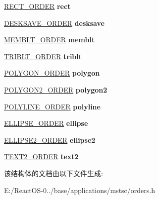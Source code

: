 \begin{DoxyCompactItemize}
\mbox{\label{struct___r_d_p___o_r_d_e_r___s_t_a_t_e_a5570ce07ebf3c90f3316fe1c67e268db}} 
\hyperlink{struct___r_e_c_t___o_r_d_e_r}{R\+E\+C\+T\+\_\+\+O\+R\+D\+ER} {\bfseries rect}
\item 
\mbox{\label{struct___r_d_p___o_r_d_e_r___s_t_a_t_e_a1d47551a1e631c6b5c34ece8b4f94918}} 
\hyperlink{struct___d_e_s_k_s_a_v_e___o_r_d_e_r}{D\+E\+S\+K\+S\+A\+V\+E\+\_\+\+O\+R\+D\+ER} {\bfseries desksave}
\item 
\mbox{\label{struct___r_d_p___o_r_d_e_r___s_t_a_t_e_a56a941c405ca7e6948a00362fc2429e1}} 
\hyperlink{struct___m_e_m_b_l_t___o_r_d_e_r}{M\+E\+M\+B\+L\+T\+\_\+\+O\+R\+D\+ER} {\bfseries memblt}
\item 
\mbox{\label{struct___r_d_p___o_r_d_e_r___s_t_a_t_e_a697766a2fd464a6e0e444dceaf68a183}} 
\hyperlink{struct___t_r_i_b_l_t___o_r_d_e_r}{T\+R\+I\+B\+L\+T\+\_\+\+O\+R\+D\+ER} {\bfseries triblt}
\item 
\mbox{\label{struct___r_d_p___o_r_d_e_r___s_t_a_t_e_a3aacbe1631a29128b24d56c6da83064e}} 
\hyperlink{struct___p_o_l_y_g_o_n___o_r_d_e_r}{P\+O\+L\+Y\+G\+O\+N\+\_\+\+O\+R\+D\+ER} {\bfseries polygon}
\item 
\mbox{\label{struct___r_d_p___o_r_d_e_r___s_t_a_t_e_a72e3ffc2f0d136071a3404be6ac2f833}} 
\hyperlink{struct___p_o_l_y_g_o_n2___o_r_d_e_r}{P\+O\+L\+Y\+G\+O\+N2\+\_\+\+O\+R\+D\+ER} {\bfseries polygon2}
\item 
\mbox{\label{struct___r_d_p___o_r_d_e_r___s_t_a_t_e_a84f168e73afc4b5b7d09705eda4cabb5}} 
\hyperlink{struct___p_o_l_y_l_i_n_e___o_r_d_e_r}{P\+O\+L\+Y\+L\+I\+N\+E\+\_\+\+O\+R\+D\+ER} {\bfseries polyline}
\item 
\mbox{\label{struct___r_d_p___o_r_d_e_r___s_t_a_t_e_aa6ada6e1bac8c5e880cf64337f8e1ccf}} 
\hyperlink{struct___e_l_l_i_p_s_e___o_r_d_e_r}{E\+L\+L\+I\+P\+S\+E\+\_\+\+O\+R\+D\+ER} {\bfseries ellipse}
\item 
\mbox{\label{struct___r_d_p___o_r_d_e_r___s_t_a_t_e_a0a4956d330f788936c4f7ce8ba06b7fc}} 
\hyperlink{struct___e_l_l_i_p_s_e2___o_r_d_e_r}{E\+L\+L\+I\+P\+S\+E2\+\_\+\+O\+R\+D\+ER} {\bfseries ellipse2}
\item 
\mbox{\label{struct___r_d_p___o_r_d_e_r___s_t_a_t_e_abdcd89a132728d033a136db3dd61134a}} 
\hyperlink{struct___t_e_x_t2___o_r_d_e_r}{T\+E\+X\+T2\+\_\+\+O\+R\+D\+ER} {\bfseries text2}
\end{DoxyCompactItemize}


该结构体的文档由以下文件生成\+:\begin{DoxyCompactItemize}
\item 
E\+:/\+React\+O\+S-\/0../base/applications/mstsc/orders.\+h\end{DoxyCompactItemize}
